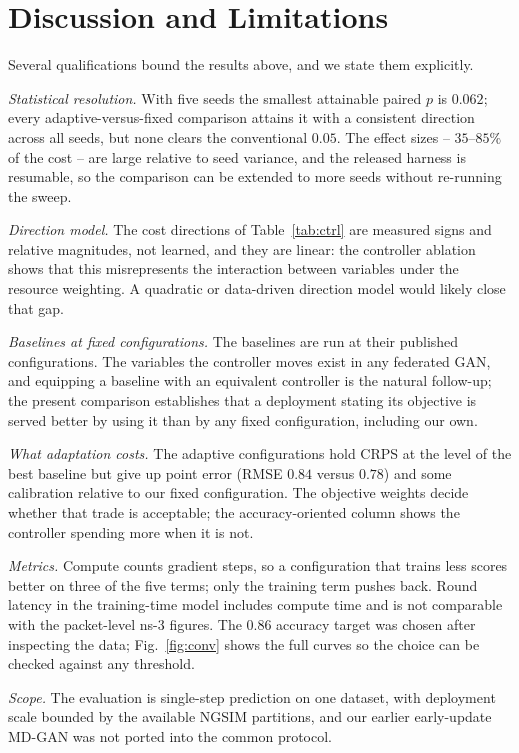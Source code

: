 \documentclass[journal]{IEEEtran}
\begin{document}
\section{Discussion and Limitations}
\label{sec:discussion}
Several qualifications bound the results above, and we state them explicitly.

\emph{Statistical resolution.} With five seeds the smallest attainable paired
$p$ is $0.062$; every adaptive-versus-fixed comparison attains it with a
consistent direction across all seeds, but none clears the conventional
$0.05$. The effect sizes -- $35$--$85\%$ of the cost -- are large relative to
seed variance, and the released harness is resumable, so the comparison can be
extended to more seeds without re-running the sweep.

\emph{Direction model.} The cost directions of Table~\ref{tab:ctrl} are
measured signs and relative magnitudes, not learned, and they are linear: the
controller ablation shows that this misrepresents the interaction between
variables under the resource weighting. A quadratic or data-driven direction
model would likely close that gap.

\emph{Baselines at fixed configurations.} The baselines are run at their
published configurations. The variables the controller moves exist in any
federated GAN, and equipping a baseline with an equivalent controller is the
natural follow-up; the present comparison establishes that a deployment stating
its objective is served better by using it than by any fixed configuration,
including our own.

\emph{What adaptation costs.} The adaptive configurations hold CRPS at the
level of the best baseline but give up point error (RMSE $0.84$ versus $0.78$)
and some calibration relative to our fixed configuration. The objective weights
decide whether that trade is acceptable; the accuracy-oriented column shows the
controller spending more when it is not.

\emph{Metrics.} Compute counts gradient steps, so a configuration that trains
less scores better on three of the five terms; only the training term pushes
back. Round latency in the training-time model includes compute time and is
not comparable with the packet-level ns-3 figures. The $0.86$ accuracy target
was chosen after inspecting the data; Fig.~\ref{fig:conv} shows the full
curves so the choice can be checked against any threshold.

\emph{Scope.} The evaluation is single-step prediction on one dataset, with
deployment scale bounded by the available NGSIM partitions, and our earlier
early-update MD-GAN was not ported into the common protocol.
\end{document}
